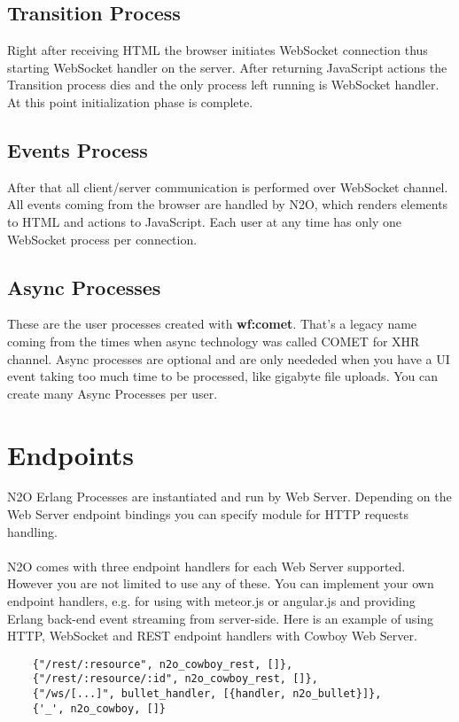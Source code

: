 \subsection{Transition Process}
Right after receiving HTML the browser initiates WebSocket connection
thus starting WebSocket handler on the server. After returning
JavaScript actions the Transition process dies and the only process left
running is WebSocket handler. At this point initialization phase is complete.

\subsection{Events Process}
After that all client/server communication is performed over
WebSocket channel. All events coming from the browser are
handled by N2O, which renders elements to HTML and actions to
JavaScript. Each user at any time has only one WebSocket process
per connection.

\subsection{Async Processes}
These are the user processes created with {\bf wf:comet}.
That's a legacy name coming from the times when async technology
was called COMET for XHR channel. Async processes are optional
and are only neededed when you have a UI event taking too much
time to be processed, like gigabyte file uploads. You can create
many Async Processes per user.

\section{Endpoints}
N2O Erlang Processes are instantiated and run by Web Server.
Depending on the Web Server endpoint bindings you can specify
module for HTTP requests handling.

\paragraph{}
N2O comes with three endpoint handlers for each Web Server supported.
However you are not limited to use any of these.
You can implement your own endpoint handlers, e.g. for using with
meteor.js or angular.js and providing Erlang back-end event streaming
from server-side. Here is an example of using HTTP, WebSocket and
REST endpoint handlers with Cowboy Web Server.

\vspace{1\baselineskip}
\begin{lstlisting}
    {"/rest/:resource", n2o_cowboy_rest, []},
    {"/rest/:resource/:id", n2o_cowboy_rest, []},
    {"/ws/[...]", bullet_handler, [{handler, n2o_bullet}]},
    {'_', n2o_cowboy, []}
\end{lstlisting}

